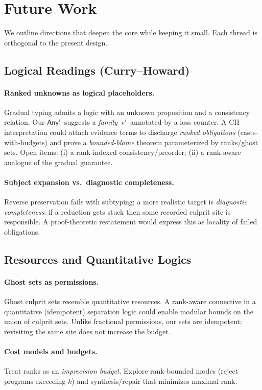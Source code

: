 \section{Future Work}
\label{sec:future}

We outline directions that deepen the core while keeping it small. Each thread is orthogonal to the present design.

\subsection{Logical Readings (Curry--Howard)}
\paragraph{Ranked unknowns as logical placeholders.}
Gradual typing admits a logic with an unknown proposition and a consistency relation. Our $\mathsf{Any}^{i}$ suggests a \emph{family} $\star^{i}$ annotated by a loss counter. A CH interpretation could attach evidence terms to discharge \emph{ranked obligations} (casts-with-budgets) and prove a \emph{bounded-blame} theorem parameterized by ranks/ghost sets. Open items: (i) a rank-indexed consistency/preorder; (ii) a rank-aware analogue of the gradual guarantee.

\paragraph{Subject expansion vs.\ diagnostic completeness.}
Reverse preservation fails with subtyping; a more realistic target is \emph{diagnostic completeness}: if a reduction gets stuck then some recorded culprit site is responsible. A proof-theoretic restatement would express this as locality of failed obligations.

\subsection{Resources and Quantitative Logics}
\paragraph{Ghost sets as permissions.}
Ghost culprit sets resemble quantitative resources. A rank-aware connective in a quantitative (idempotent) separation logic could enable modular bounds on the union of culprit sets. Unlike fractional permissions, our sets are idempotent: revisiting the same site does not increase the budget.

\paragraph{Cost models and budgets.}
Treat ranks as an \emph{imprecision budget}. Explore rank-bounded modes (reject programs exceeding $k$) and synthesis/repair that minimizes maximal rank.

